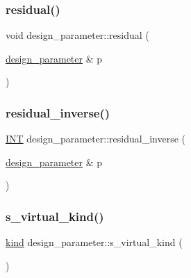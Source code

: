 \mbox{\label{classdesign__parameter_a927b3017b92919197fa53d9888409411}} 
\subsubsection{\texorpdfstring{residual()}{residual()}}
{\footnotesize\ttfamily void design\+\_\+parameter\+::residual (\begin{DoxyParamCaption}\item[{\mbox{\hyperlink{classdesign__parameter}{design\+\_\+parameter}} \&}]{p }\end{DoxyParamCaption})}

\mbox{\label{classdesign__parameter_a98630a1cdc565c3c826a2636a499c5f6}} 
\subsubsection{\texorpdfstring{residual\+\_\+inverse()}{residual\_inverse()}}
{\footnotesize\ttfamily \mbox{\hyperlink{galois_8h_a09fddde158a3a20bd2dcadb609de11dc}{I\+NT}} design\+\_\+parameter\+::residual\+\_\+inverse (\begin{DoxyParamCaption}\item[{\mbox{\hyperlink{classdesign__parameter}{design\+\_\+parameter}} \&}]{p }\end{DoxyParamCaption})}

\mbox{\label{classdesign__parameter_af41eca1f66a8113dd0b892b26d791028}} 
\subsubsection{\texorpdfstring{s\+\_\+virtual\+\_\+kind()}{s\_virtual\_kind()}}
{\footnotesize\ttfamily \mbox{\hyperlink{discreta_8h_aaf25ee7e2306d78c74ec7bc48f092e81}{kind}} design\+\_\+parameter\+::s\+\_\+virtual\+\_\+kind (\begin{DoxyParamCaption}{ }\end{DoxyParamCaption})\hspace{0.3cm}{\ttfamily [virtual]}}



